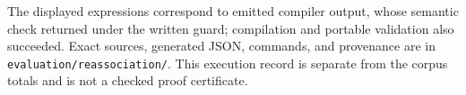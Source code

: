 \label{app:reassociation-record}
The displayed expressions correspond to emitted compiler output, whose
semantic check returned  under the written guard; compilation
and portable validation also succeeded. Exact sources, generated JSON,
commands, and provenance are in \nolinkurl{evaluation/reassociation/}.
This execution record is separate from the corpus totals and is not a
checked proof certificate.
